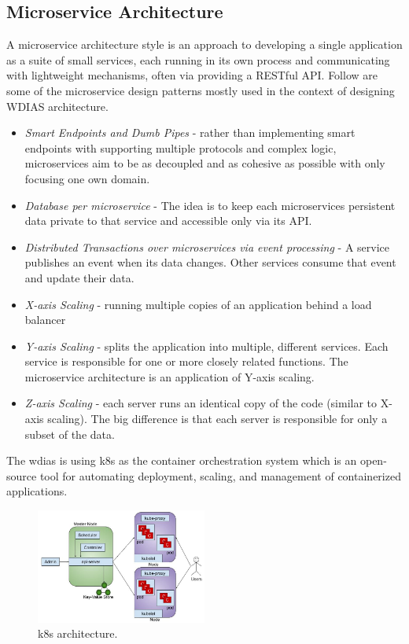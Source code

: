 \documentclass[conference]{IEEEtran}
\begin{document}
\subsection{Microservice Architecture}
\label{psubse:microservice_architecture}

A microservice architecture style is an approach to developing a single application as
a suite of small services, each running in its own process and communicating with
lightweight mechanisms, often via providing a RESTful API. Follow are some of the microservice design patterns mostly used in the context of designing WDIAS architecture.
\begin{itemize}
    \item \emph{Smart Endpoints and Dumb Pipes} - rather than implementing smart endpoints with supporting multiple protocols and complex logic, microservices aim to be as decoupled and as cohesive as possible with only focusing one own domain.
    \item \emph{Database per microservice} - The idea is to keep each microservices persistent data private to that service and accessible only via its API.
    \item \emph{Distributed Transactions over microservices via event processing} - A service publishes an event when its data changes. Other services consume that event and update their data.
    \item \emph{X-axis Scaling} -  running multiple copies of an application behind a load balancer
    \item \emph{Y-axis Scaling} - splits the application into multiple, different services. Each service is responsible for one or more closely related functions. The microservice architecture is an application of Y-axis scaling.
    \item \emph{Z-axis Scaling} - each server runs an identical copy of the code (similar to X-axis scaling). The big difference is that each server is responsible for only a subset of the data.
\end{itemize}

The \acrshort{wdias} is using \acrfull{k8s} as the container orchestration system which is an open-source tool for automating deployment, scaling, and management of containerized applications.

\begin{figure}[htbp]
\centerline{\includegraphics[width=0.5\textwidth]{method/microservice/k8s_architecture_v3.jpg}}
\caption{\acrfull{k8s} architecture.}
\label{pfi:k8s_architecture}
\end{figure}
\end{document}
